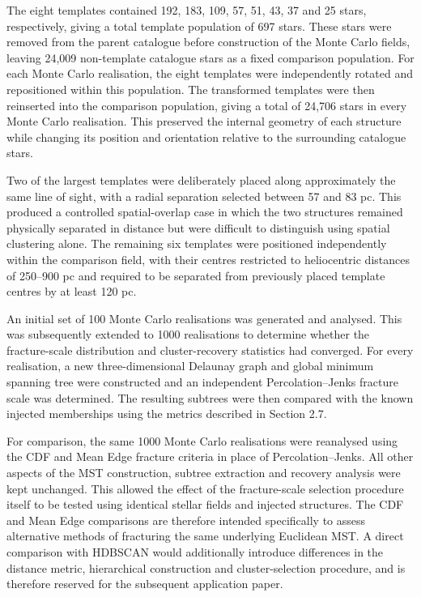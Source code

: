 \documentclass[fleqn,usenatbib]{mnras}
\begin{document}
The eight templates contained 192, 183, 109, 57, 51, 43, 37 and 25 stars, respectively, giving a total template population of 697 stars. These stars were removed from the parent catalogue before construction of the Monte Carlo fields, leaving 24,009 non-template catalogue stars as a fixed comparison population. For each Monte Carlo realisation, the eight templates were independently rotated and repositioned within this population. The transformed templates were then reinserted into the comparison population, giving a total of 24,706 stars in every Monte Carlo realisation. This preserved the internal geometry of each structure while changing its position and orientation relative to the surrounding catalogue stars.

Two of the largest templates were deliberately placed along approximately the same line of sight, with a radial separation selected between 57 and 83 pc. This produced a controlled spatial-overlap case in which the two structures remained physically separated in distance but were difficult to distinguish using spatial clustering alone. The remaining six templates were positioned independently within the comparison field, with their centres restricted to heliocentric distances of 250–900 pc and required to be separated from previously placed template centres by at least 120 pc.

An initial set of 100 Monte Carlo realisations was generated and analysed. This was subsequently extended to 1000 realisations to determine whether the fracture-scale distribution and cluster-recovery statistics had converged. For every realisation, a new three-dimensional Delaunay graph and global minimum spanning tree were constructed and an independent Percolation–Jenks fracture scale was determined. The resulting subtrees were then compared with the known injected memberships using the metrics described in Section 2.7.

For comparison, the same 1000 Monte Carlo realisations were reanalysed using the CDF and Mean Edge fracture criteria in place of Percolation–Jenks. All other aspects of the MST construction, subtree extraction and recovery analysis were kept unchanged. This allowed the effect of the fracture-scale selection procedure itself to be tested using identical stellar fields and injected structures. The CDF and Mean Edge comparisons are therefore intended specifically to assess alternative methods of fracturing the same underlying Euclidean MST. A direct comparison with HDBSCAN would additionally introduce differences in the distance metric, hierarchical construction and cluster-selection procedure, and is therefore reserved for the subsequent application paper.
\end{document}
